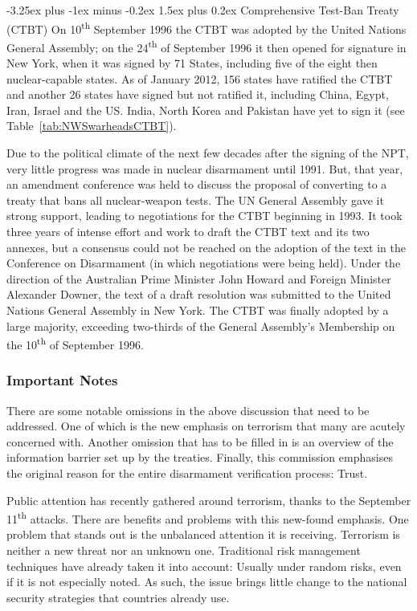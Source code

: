 \documentclass[twoside,titlepage,11pt,twocolumn,a4paper]{article}
\makeatletter
\renewcommand{\paragraph}{\@startsection{paragraph}{4}{0ex}%
   {-3.25ex plus -1ex minus -0.2ex}%
   {1.5ex plus 0.2ex}%
   {\normalfont\normalsize\bfseries}}
\makeatother
\begin{document}
\paragraph{Comprehensive Test-Ban Treaty (CTBT)}
On 10\textsuperscript{th} September 1996 the CTBT was adopted by the
United Nations General Assembly; on the 24\textsuperscript{th} of
September 1996 it then opened for signature in New York, when it was
signed by 71 States, including five of the eight then nuclear-capable
states. As of January 2012, 156 states have ratified the CTBT and
another 26 states have signed but not ratified it, including China,
Egypt, Iran, Israel and the US. India, North Korea and
Pakistan have yet to sign it (see Table~\ref{tab:NWSwarheadsCTBT}).

Due to the political climate of the next few decades after the signing
of the NPT, very little progress was made in nuclear disarmament until
1991. But, that year, an amendment conference was held to discuss the
proposal of converting to a treaty that bans all nuclear-weapon
tests. The UN General Assembly gave it strong support, leading to
negotiations for the CTBT beginning in 1993. It took three years of
intense effort and work to draft the CTBT text and its two annexes,
but a consensus could not be reached on the adoption of the text in
the Conference on Disarmament (in which negotiations were being
held). Under the direction of the Australian Prime Minister John
Howard and Foreign Minister Alexander Downer, the text of a draft
resolution was submitted to the United Nations General Assembly in New
York. The CTBT was finally adopted by a large majority, exceeding
two-thirds of the General Assembly's Membership on the
10\textsuperscript{th} of September 1996.

\subsubsection{Important Notes}
There are some notable omissions in the above discussion that need to
be addressed. One of which is the new emphasis on terrorism that many
are acutely concerned with. Another omission that has to be filled in
is an overview of the information barrier set up by the
treaties. Finally, this commission emphasises the original reason for
the entire disarmament verification process: Trust.

Public attention has recently gathered around terrorism, thanks to the
September 11\textsuperscript{th} attacks. There are benefits and
problems with this new-found emphasis. One problem that stands out is
the unbalanced attention it is receiving. Terrorism is neither a new
threat nor an unknown one. Traditional risk management techniques have
already taken it into account: Usually under random risks, even if it
is not especially noted. As such, the issue brings little change to
the national security strategies that countries already use.
\end{document}
